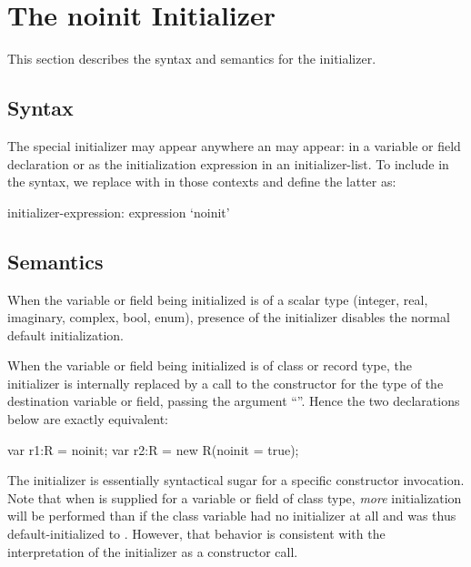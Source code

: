 
\section{The {\bf noinit} Initializer}
\label{noinit}

This section describes the syntax and semantics for the 
initializer.

\subsection{Syntax}
\label{noinit_Syntax}

The special initializer  may appear anywhere an 
may appear: in a variable or field declaration or as the initialization expression in an
initializer-list.  To include  in the syntax, we replace 
with  in those contexts and define the latter as:
\begin{syntax}
initializer-expression:
  expression
  `noinit'
\end{syntax}

\subsection{Semantics}
\label{noinit_Semantics}

When the variable or field being initialized is of a scalar type (integer, real, imaginary,
complex, bool, enum), presence of the  initializer disables the normal
default initialization. 

When the variable or field being initialized is of class or record type, the 
initializer is internally replaced by a call to the constructor for the type of the
destination variable or field, passing the argument ``''.  Hence the
two declarations below are exactly equivalent: 
\begin{chapel}
var r1:R = noinit;
var r2:R = new R(noinit = true);
\end{chapel}
\noindent
The  initializer is essentially syntactical sugar for a specific constructor
invocation.  Note that when  is supplied for a variable or field of class
type, \emph{more} initialization will be performed than if the class variable had no
initializer at all and was thus default-initialized to .  However, that behavior
is consistent with the interpretation of the  initializer as a constructor call.

